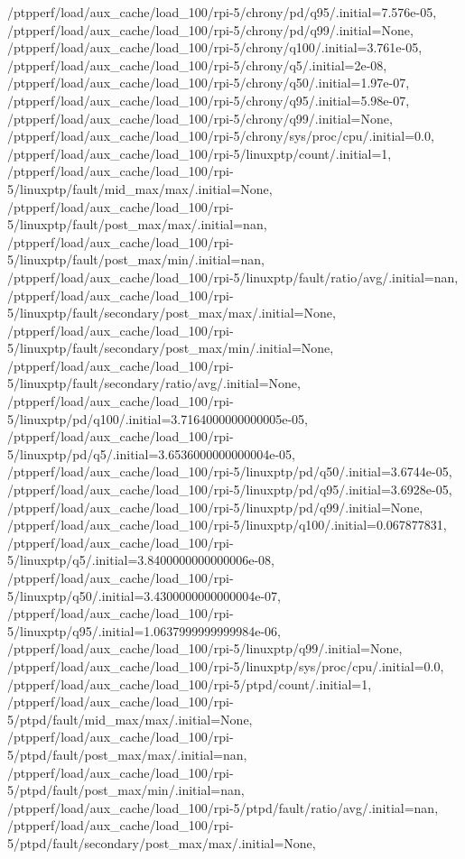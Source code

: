 {    /ptpperf/load/aux_cache/load_100/rpi-5/chrony/pd/q95/.initial=7.576e-05,
    /ptpperf/load/aux_cache/load_100/rpi-5/chrony/pd/q99/.initial=None,
    /ptpperf/load/aux_cache/load_100/rpi-5/chrony/q100/.initial=3.761e-05,
    /ptpperf/load/aux_cache/load_100/rpi-5/chrony/q5/.initial=2e-08,
    /ptpperf/load/aux_cache/load_100/rpi-5/chrony/q50/.initial=1.97e-07,
    /ptpperf/load/aux_cache/load_100/rpi-5/chrony/q95/.initial=5.98e-07,
    /ptpperf/load/aux_cache/load_100/rpi-5/chrony/q99/.initial=None,
    /ptpperf/load/aux_cache/load_100/rpi-5/chrony/sys/proc/cpu/.initial=0.0,
    /ptpperf/load/aux_cache/load_100/rpi-5/linuxptp/count/.initial=1,
    /ptpperf/load/aux_cache/load_100/rpi-5/linuxptp/fault/mid_max/max/.initial=None,
    /ptpperf/load/aux_cache/load_100/rpi-5/linuxptp/fault/post_max/max/.initial=nan,
    /ptpperf/load/aux_cache/load_100/rpi-5/linuxptp/fault/post_max/min/.initial=nan,
    /ptpperf/load/aux_cache/load_100/rpi-5/linuxptp/fault/ratio/avg/.initial=nan,
    /ptpperf/load/aux_cache/load_100/rpi-5/linuxptp/fault/secondary/post_max/max/.initial=None,
    /ptpperf/load/aux_cache/load_100/rpi-5/linuxptp/fault/secondary/post_max/min/.initial=None,
    /ptpperf/load/aux_cache/load_100/rpi-5/linuxptp/fault/secondary/ratio/avg/.initial=None,
    /ptpperf/load/aux_cache/load_100/rpi-5/linuxptp/pd/q100/.initial=3.7164000000000005e-05,
    /ptpperf/load/aux_cache/load_100/rpi-5/linuxptp/pd/q5/.initial=3.6536000000000004e-05,
    /ptpperf/load/aux_cache/load_100/rpi-5/linuxptp/pd/q50/.initial=3.6744e-05,
    /ptpperf/load/aux_cache/load_100/rpi-5/linuxptp/pd/q95/.initial=3.6928e-05,
    /ptpperf/load/aux_cache/load_100/rpi-5/linuxptp/pd/q99/.initial=None,
    /ptpperf/load/aux_cache/load_100/rpi-5/linuxptp/q100/.initial=0.067877831,
    /ptpperf/load/aux_cache/load_100/rpi-5/linuxptp/q5/.initial=3.8400000000000006e-08,
    /ptpperf/load/aux_cache/load_100/rpi-5/linuxptp/q50/.initial=3.4300000000000004e-07,
    /ptpperf/load/aux_cache/load_100/rpi-5/linuxptp/q95/.initial=1.0637999999999984e-06,
    /ptpperf/load/aux_cache/load_100/rpi-5/linuxptp/q99/.initial=None,
    /ptpperf/load/aux_cache/load_100/rpi-5/linuxptp/sys/proc/cpu/.initial=0.0,
    /ptpperf/load/aux_cache/load_100/rpi-5/ptpd/count/.initial=1,
    /ptpperf/load/aux_cache/load_100/rpi-5/ptpd/fault/mid_max/max/.initial=None,
    /ptpperf/load/aux_cache/load_100/rpi-5/ptpd/fault/post_max/max/.initial=nan,
    /ptpperf/load/aux_cache/load_100/rpi-5/ptpd/fault/post_max/min/.initial=nan,
    /ptpperf/load/aux_cache/load_100/rpi-5/ptpd/fault/ratio/avg/.initial=nan,
    /ptpperf/load/aux_cache/load_100/rpi-5/ptpd/fault/secondary/post_max/max/.initial=None,
}

